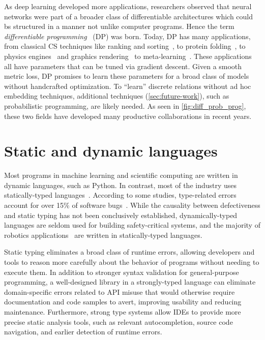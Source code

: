 As deep learning developed more applications, researchers observed that neural networks were part of a broader class of differentiable architectures which could bs structured in a manner not unlike computer programs. Hence the term \textit{differentiable programming}~\citep{olah2015neural, baydin2016differentiable, plotkin2018some} (DP) was born. Today, DP has many applications, from classical CS techniques like ranking and sorting~\citep{cuturi2019differentiable, blondel2020fast}, to protein folding~\citep{alquraishi2018end}, to physics engines~\citep{hu2019difftaichi, de2018end, degrave2016differentiable} and graphics rendering~\citep{loper2014opendr} to meta-learning~\citep{liu2018darts, chandra2019gradient}. These applications all have parameters that can be tuned via gradient descent. Given a smooth metric loss, DP promises to learn these parameters for a broad class of models without handcrafted optimization. To ``learn'' discrete relations without ad hoc embedding techniques, additional techniques (\autoref{sec:future-work}), such as probabilistic programming, are likely needed. As seen in \autoref{fig:diff_prob_prog}, these two fields have developed many productive collaborations in recent years.

\section{Static and dynamic languages}

Most programs in machine learning and scientific computing are written in dynamic languages, such as Python. In contrast, most of the industry uses statically-typed languages~\citep{github}. According to some studies, type-related errors account for over 15\% of software bugs~\citep{gao2017type}. While the causality between defectiveness and static typing has not been conclusively established, dynamically-typed languages are seldom used for building safety-critical systems, and the majority of robotics applications~\citep{guenther2018serious} are written in statically-typed languages.

Static typing eliminates a broad class of runtime errors, allowing developers and tools to reason more carefully about the behavior of programs without needing to execute them. In addition to stronger syntax validation for general-purpose programming, a well-designed library in a strongly-typed language can eliminate domain-specific errors related to API misuse that would otherwise require documentation and code samples to avert, improving usability and reducing maintenance. Furthermore, strong type systems allow IDEs to provide more precise static analysis tools, such as relevant autocompletion, source code navigation, and earlier detection of runtime errors.

